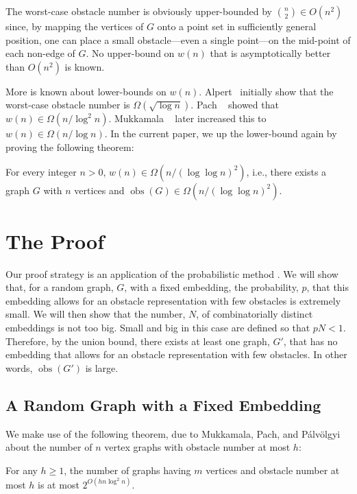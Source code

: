 \documentclass{patmorin}
\DeclareMathOperator{\obs}{obs}
\begin{document}
The worst-case obstacle number is obviously upper-bounded by
$\binom{n}{2}\in O(n^2)$ since, by mapping the vertices of $G$
 onto a point set in sufficiently general position, one can place
a small obstacle---even a single point---on the mid-point of each non-edge
of $G$.  No upper-bound on $w(n)$ that is asymptotically better than
$O(n^2)$ is known.

More is known about lower-bounds on $w(n)$.  Alpert \etal\
initially show that the worst-case obstacle number is
$\Omega(\sqrt{\log n})$.
Pach \etal\ \cite{mukkamala.pach.ea:graphs} showed that
$w(n)\in \Omega(n/\log^2 n)$.
Mukkamala \etal\ \cite{mukkamala.pach.ea:lower} later increased this
to $w(n)\in\Omega(n/\log n)$.  In the current paper, we up the lower-bound
again by proving the following theorem:
\begin{thm}
  For every integer $n>0$, $w(n)\in\Omega(n/(\log\log n)^2)$, i.e., there
  exists a graph $G$ with $n$ vertices and $\obs(G)\in\Omega(n/(\log\log
  n)^2)$.
\end{thm}

\section{The Proof}

Our proof strategy is an application of the probabilistic method
\cite{alon.spencer:probabilistic}.  We will show that, for a random graph,
$G$, with a fixed embedding, the probability, $p$, that this embedding
allows for an obstacle representation with few obstacles is extremely
small.  We will then show that the number, $N$, of combinatorially
distinct embeddings is not too big.  Small and big in this case are
defined so that $pN < 1$.  Therefore, by the union bound, there exists at
least one graph, $G'$, that has no embedding that allows for an obstacle
representation with few obstacles.  In other words, $\obs(G')$ is large.

\subsection{A Random Graph with a Fixed Embedding}

We make use of the following theorem, due to Mukkamala, Pach, and
P\'alv\"olgyi \cite{mukkamala.pach.ea:lower} about the number of $n$
vertex graphs with obstacle number at most $h$:
\begin{thm}[Mukkamala, Pach, and P\'alv\"olgyi 2012]
  For any $h\ge 1$, the number of graphs having $m$ vertices and
  obstacle number at most $h$ is at most $2^{O(hn\log^2 n)}$.
\end{thm}
\end{document}
